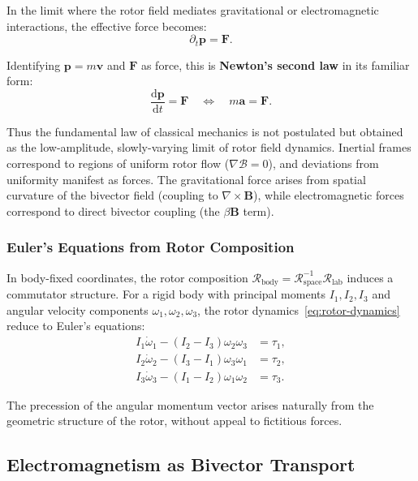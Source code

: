 \documentclass[11pt,a4paper]{article}
\newcommand{\Rotor}{\mathcal{R}}
\newcommand{\Biv}{\mathcal{B}}
\newcommand{\D}{\nabla}                        %
\theoremstyle{definition}
\theoremstyle{plain}
\theoremstyle{remark}
\begin{document}
In the limit where the rotor field mediates gravitational or electromagnetic interactions, the effective force becomes:
\begin{equation}
\partial_t \mathbf{p} = \mathbf{F}.
\label{eq:newton-translational}
\end{equation}

Identifying $\mathbf{p} = m\mathbf{v}$ and $\mathbf{F}$ as force, this is \textbf{Newton's second law} in its familiar form:
\begin{equation}
\boxed{\frac{\mathrm{d}\mathbf{p}}{\mathrm{d}t} = \mathbf{F} \quad \Longleftrightarrow \quad m\mathbf{a} = \mathbf{F}.}
\label{eq:newton-final}
\end{equation}

Thus the fundamental law of classical mechanics is not postulated but obtained as the low-amplitude, slowly-varying limit of rotor field dynamics. Inertial frames correspond to regions of uniform rotor flow ($\D\Biv = 0$), and deviations from uniformity manifest as forces. The gravitational force arises from spatial curvature of the bivector field (coupling to $\nabla \times \mathbf{B}$), while electromagnetic forces correspond to direct bivector coupling (the $\beta\mathbf{B}$ term).

\subsubsection{Euler's Equations from Rotor Composition}

In body-fixed coordinates, the rotor composition $\Rotor_{\text{body}} = \Rotor_{\text{space}}^{-1} \Rotor_{\text{lab}}$ induces a commutator structure. For a rigid body with principal moments $I_1, I_2, I_3$ and angular velocity components $\omega_1, \omega_2, \omega_3$, the rotor dynamics~\eqref{eq:rotor-dynamics} reduce to Euler's equations:
\begin{align}
I_1 \dot{\omega}_1 - (I_2 - I_3)\omega_2\omega_3 &= \tau_1, \\
I_2 \dot{\omega}_2 - (I_3 - I_1)\omega_3\omega_1 &= \tau_2, \\
I_3 \dot{\omega}_3 - (I_1 - I_2)\omega_1\omega_2 &= \tau_3.
\end{align}

The precession of the angular momentum vector arises naturally from the geometric structure of the rotor, without appeal to fictitious forces.

\subsection{Electromagnetism as Bivector Transport}
\end{document}
